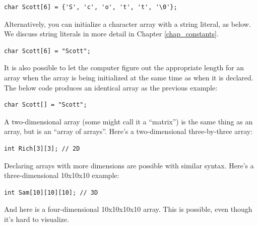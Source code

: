 \noindent\begin{minipage}{\linewidth}\begin{lstlisting}
char Scott[6] = {'S', 'c', 'o', 't', 't', '\0'};	
\end{lstlisting}\end{minipage}

Alternatively, you can initialize a character array with a string literal, as below. 
We discuss string literals in more detail in Chapter \ref{chap_constants}.

\noindent\begin{minipage}{\linewidth}\begin{lstlisting}
char Scott[6] = "Scott";	
\end{lstlisting}\end{minipage}

It is also possible to let the computer figure out the appropriate length for an array when the array is being initialized at the same time as when it is declared. 
The below code produces an identical array as the previous example:

\noindent\begin{minipage}{\linewidth}\begin{lstlisting}
char Scott[] = "Scott";	
\end{lstlisting}\end{minipage}


A two-dimensional array (some might call it a ``matrix'') is the same thing as an array, but is an ``array of arrays''.
Here's a two-dimensional three-by-three array:

\noindent\begin{minipage}{\linewidth}\begin{lstlisting}
int Rich[3][3]; // 2D
\end{lstlisting}\end{minipage}

Declaring arrays with more dimensions are possible with similar syntax. 
Here's a three-dimensional 10x10x10 example:

\noindent\begin{minipage}{\linewidth}\begin{lstlisting}
int Sam[10][10][10]; // 3D
\end{lstlisting}\end{minipage}

And here is a four-dimensional 10x10x10x10 array. 
This is possible, even though it's hard to visualize.


